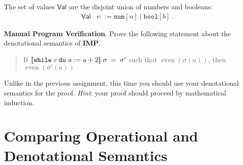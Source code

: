 \documentclass[12pt]{exam}
\newcommand{\fmtkw}[1]{\mathtt{#1}}
\newcommand{\Expr}{\ensuremath{\mathsf{Exp}}}
\newcommand{\expr}{\ensuremath{\mathit{e}}}
\newcommand{\addr}{\ensuremath{\mathit{a}}}
\newcommand{\numa}[1]{\ensuremath{\fmtkw{num}[#1]}}
\newcommand{\num}{\ensuremath{\mathit{n}}}
\newcommand{\boola}[1]{\ensuremath{\fmtkw{bool}[#1]}}
\newcommand{\bool}{\ensuremath{\mathit{b}}}
\newcommand{\plusc}[2]{\ensuremath{#1 \mathbin{\fmtkw{+}} #2}}
\newcommand{\Cmd}{\ensuremath{\mathsf{Cmd}}}
\newcommand{\cmd}{\ensuremath{\mathit{c}}}
\newcommand{\setc}[2]{\ensuremath{#1 \mathrel{\fmtkw{:=}} #2}}
\newcommand{\whilec}[2]{\ensuremath{\fmtkw{while}\;#1\;\fmtkw{do}\;#2}}
\newcommand{\val}{\ensuremath{\mathit{v}}}
\newcommand{\Val}{\ensuremath{\mathsf{Val}}}
\newcommand{\store}{\ensuremath{\sigma}}
\newcommand{\Store}{\ensuremath{\mathsf{Store}}}
\newcommand{\IMP}{\textbf{\textsf{IMP}}\xspace}
\newcommand{\state}[2]{\langle #1, #2 \rangle}
\newcommand{\eval}[2]{\ensuremath{#1 \Downarrow #2}}
\newcommand{\even}{\operatorname{even}}
\begin{document}
The set of values \Val{} are the disjoint union of numbers and booleans:
\[\begin{array}{lrcl}
\Val & \val ::=  \numa{\num} \mid \boola{\bool} \;.
\end{array}\]

\begin{questions}
\question
{}

\question \textbf{Manual Program Verification}.  Prove the following statement
about the denotational semantics of \IMP.
\begin{quote}
If
\( \denote{\whilec{\expr}{\setc{\addr}{\plusc{\addr}{2}}}}\;\sigma \;=\; \sigma'
\)
such that $\even(\store(\addr))$, then $\even(\store'(\addr))$
\end{quote}
Unlike in the previous assignment, this time you should use your denotational semantics for the proof. \emph{Hint}: your proof should proceed by mathematical induction.
\end{questions}

\section{Comparing Operational and Denotational Semantics}
\end{document}

